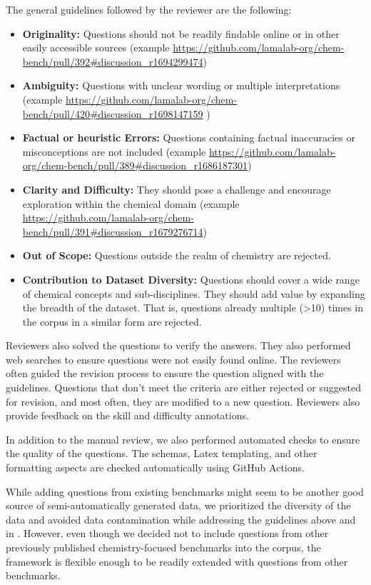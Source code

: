 The general guidelines followed by the reviewer are the following:

\begin{itemize}
    \item \textbf{Originality:} Questions should not be readily findable online or in other easily accessible sources (example \url{https://github.com/lamalab-org/chem-bench/pull/392#discussion_r1694299474})
    \item \textbf{Ambiguity:} Questions with unclear wording or multiple interpretations (example \url{https://github.com/lamalab-org/chem-bench/pull/420#discussion_r1698147159} )
    \item \textbf{Factual or heuristic Errors: }Questions containing factual inaccuracies or misconceptions are not included (example \url{https://github.com/lamalab-org/chem-bench/pull/389#discussion_r1686187301})
    \item \textbf{Clarity and Difficulty: } They should pose a challenge and encourage exploration within the chemical domain (example \url{https://github.com/lamalab-org/chem-bench/pull/391#discussion_r1679276714})
    \item \textbf{Out of Scope:} Questions outside the realm of chemistry are rejected.
    \item \textbf{Contribution to Dataset Diversity: }Questions should cover a wide range of chemical concepts and sub-disciplines. They should add value by expanding the breadth of the dataset. That is, questions already multiple (>10) times in the corpus in a similar form are rejected.
\end{itemize}

Reviewers also solved the questions to verify the answers. They also performed web searches to ensure questions were not easily found online. The reviewers often guided the revision process to ensure the question aligned with the guidelines. Questions that don't meet the criteria are either rejected or suggested for revision, and most often, they are modified to a new question. Reviewers also provide feedback on the skill and difficulty annotations.

In addition to the manual review, we also performed automated checks to ensure the quality of the questions. The schemas, Latex templating, and other formatting aspects are checked automatically using GitHub Actions.

While adding questions from existing benchmarks might seem to be another good source of semi-automatically generated data, we prioritized the diversity of the data and avoided data contamination while addressing the guidelines above and in .
However, even though we decided not to include questions from other previously published chemistry-focused benchmarks into the \chembench corpus, the framework is flexible enough to be readily extended with questions from other benchmarks.

